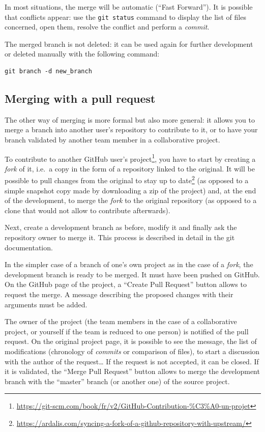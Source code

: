 \documentclass[
  12pt,
  american,
  a4paper,
  extrafontsizes,onecolumn,openright
  ]{memoir}
\newlength{\rf}
\begin{document}
In most situations, the merge will be automatic (\enquote{Fast Forward}).
It is possible that conflicts appear: use the \texttt{git\ status} command to display the list of files concerned, open them, resolve the conflict and perform a \emph{commit}.

The merged branch is not deleted: it can be used again for further development or deleted manually with the following command:

\begin{verbatim}
git branch -d new_branch
\end{verbatim}

\hypertarget{merging-with-a-pull-request}{%
\subsection{Merging with a pull request}\label{merging-with-a-pull-request}}

The other way of merging is more formal but also more general: it allows you to merge a branch into another user's repository to contribute to it, or to have your branch validated by another team member in a collaborative project.

To contribute to another GitHub user's project\footnote{\url{https://git-scm.com/book/fr/v2/GitHub-Contribution-\%C3\%A0-un-projet}}, you have to start by creating a \emph{fork} of it, i.e.~a copy in the form of a repository linked to the original.
It will be possible to pull changes from the original to stay up to date\footnote{\url{https://ardalis.com/syncing-a-fork-of-a-github-repository-with-upstream/}} (as opposed to a simple snapshot copy made by downloading a zip of the project) and, at the end of the development, to merge the \emph{fork} to the original repository (as opposed to a clone that would not allow to contribute afterwards).

Next, create a development branch as before, modify it and finally ask the repository owner to merge it.
This process is described in detail in the git documentation.

In the simpler case of a branch of one's own project as in the case of a \emph{fork}, the development branch is ready to be merged.
It must have been pushed on GitHub.
On the GitHub page of the project, a \enquote{Create Pull Request} button allows to request the merge.
A message describing the proposed changes with their arguments must be added.

The owner of the project (the team members in the case of a collaborative project, or yourself if the team is reduced to one person) is notified of the pull request.
On the original project page, it is possible to see the message, the list of modifications (chronology of \emph{commits} or comparison of files), to start a discussion with the author of the request\ldots{}
If the request is not accepted, it can be closed.
If it is validated, the \enquote{Merge Pull Request} button allows to merge the development branch with the \enquote{master} branch (or another one) of the source project.
\end{document}
